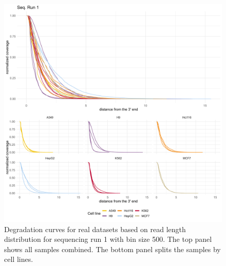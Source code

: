 \begin{figure}[p]
    \centering
    \includegraphics[width=\textwidth]{figures/sec-2-length-sgnex-curves.png}
    \caption[Degradation curves for real datasets based on read length distribution]{Degradation curves for real datasets based on read length distribution for sequencing run 1 with bin size 500. The top panel shows all samples combined. The bottom panel splits the samples by cell lines.}
    \label{fig:length-sgnex-curves}
\end{figure}

